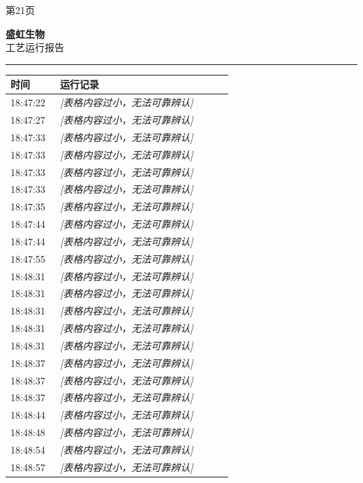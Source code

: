 \documentclass[UTF8,10pt,a4paper,fontset=fandol]{ctexart}
\begin{document}
\begin{center}
\begin{minipage}[t]{0.47\linewidth}
\vspace{2pt}
第21页
\end{minipage}
\hfill
\begin{minipage}[t]{0.47\linewidth}
\centering
\textbf{盛虹生物}\\[2pt]
工艺运行报告\\[-1pt]
\textcolor{yellow}{\rule{\linewidth}{0.6pt}}

\begin{tabular}{|p{0.20\linewidth}|p{0.70\linewidth}|}
\hline
时间 & 运行记录 \\ \hline
18:47:22 & \textit{[表格内容过小，无法可靠辨认]} \\ \hline
18:47:27 & \textit{[表格内容过小，无法可靠辨认]} \\ \hline
18:47:33 & \textit{[表格内容过小，无法可靠辨认]} \\ \hline
18:47:33 & \textit{[表格内容过小，无法可靠辨认]} \\ \hline
18:47:33 & \textit{[表格内容过小，无法可靠辨认]} \\ \hline
18:47:33 & \textit{[表格内容过小，无法可靠辨认]} \\ \hline
18:47:35 & \textit{[表格内容过小，无法可靠辨认]} \\ \hline
18:47:44 & \textit{[表格内容过小，无法可靠辨认]} \\ \hline
18:47:44 & \textit{[表格内容过小，无法可靠辨认]} \\ \hline
18:47:55 & \textit{[表格内容过小，无法可靠辨认]} \\ \hline
18:48:31 & \textit{[表格内容过小，无法可靠辨认]} \\ \hline
18:48:31 & \textit{[表格内容过小，无法可靠辨认]} \\ \hline
18:48:31 & \textit{[表格内容过小，无法可靠辨认]} \\ \hline
18:48:31 & \textit{[表格内容过小，无法可靠辨认]} \\ \hline
18:48:31 & \textit{[表格内容过小，无法可靠辨认]} \\ \hline
18:48:37 & \textit{[表格内容过小，无法可靠辨认]} \\ \hline
18:48:37 & \textit{[表格内容过小，无法可靠辨认]} \\ \hline
18:48:37 & \textit{[表格内容过小，无法可靠辨认]} \\ \hline
18:48:44 & \textit{[表格内容过小，无法可靠辨认]} \\ \hline
18:48:48 & \textit{[表格内容过小，无法可靠辨认]} \\ \hline
18:48:54 & \textit{[表格内容过小，无法可靠辨认]} \\ \hline
18:48:57 & \textit{[表格内容过小，无法可靠辨认]} \\ \hline
\end{tabular}


\end{minipage}
\end{center}
\end{document}
